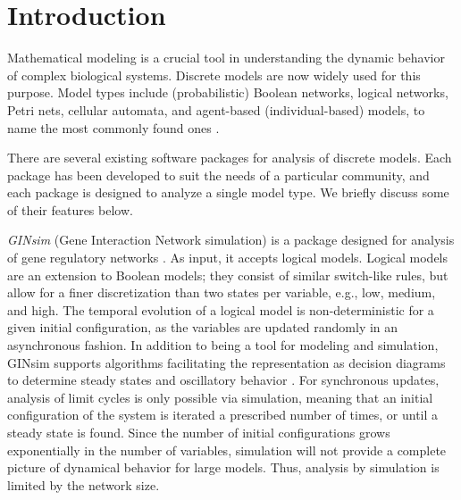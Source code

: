 \documentclass[11pt]{amsart}
\begin{document}
\section{Introduction}
Mathematical modeling is a crucial tool in understanding the dynamic behavior of complex
biological systems. Discrete models are now widely used for this purpose.  Model types include
(probabilistic) Boolean networks, logical networks, Petri nets, cellular
automata, and agent-based (individual-based) models, to name the most commonly found ones \cite{Steggles, heiner-petri, shmulevich, Chaouiya, cell-automata, springer_book}.

There are several existing software packages for analysis of discrete models. Each package has been developed to suit the needs of a particular community, and each package is designed to analyze a single model type. We briefly discuss some of their features below.


{\it GINsim} (Gene Interaction Network simulation) is a package designed for analysis of gene regulatory networks \cite{GINsim}. As input, it accepts logical models. Logical models are an extension to Boolean models; they consist of similar switch-like rules, but allow for a finer discretization than two states per variable, e.g., low, medium, and high. The temporal evolution of a logical model is non-deterministic for a given initial configuration, as the variables are updated randomly in an asynchronous fashion. In addition to being a tool for modeling and simulation, GINsim supports algorithms facilitating the representation as decision diagrams to determine steady states and oscillatory behavior \cite{Chaouiya}. For synchronous updates, analysis of limit cycles is only possible via simulation, meaning that an
initial configuration of the system is iterated a prescribed number of times, or until a
steady state is found. Since the number of initial configurations grows exponentially in the number of variables, simulation
will not provide a complete picture of dynamical behavior for large models. Thus, analysis by simulation is limited by the network size.   
\end{document}
